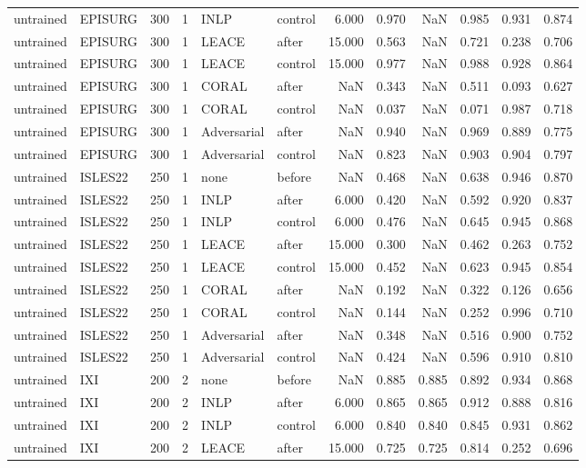 \begin{tabular}{llrrllrrrrrr}
untrained & EPISURG & 300 & 1 & INLP & control & 6.000 & 0.970 & NaN & 0.985 & 0.931 & 0.874 \\
untrained & EPISURG & 300 & 1 & LEACE & after & 15.000 & 0.563 & NaN & 0.721 & 0.238 & 0.706 \\
untrained & EPISURG & 300 & 1 & LEACE & control & 15.000 & 0.977 & NaN & 0.988 & 0.928 & 0.864 \\
untrained & EPISURG & 300 & 1 & CORAL & after & NaN & 0.343 & NaN & 0.511 & 0.093 & 0.627 \\
untrained & EPISURG & 300 & 1 & CORAL & control & NaN & 0.037 & NaN & 0.071 & 0.987 & 0.718 \\
untrained & EPISURG & 300 & 1 & Adversarial & after & NaN & 0.940 & NaN & 0.969 & 0.889 & 0.775 \\
untrained & EPISURG & 300 & 1 & Adversarial & control & NaN & 0.823 & NaN & 0.903 & 0.904 & 0.797 \\
untrained & ISLES22 & 250 & 1 & none & before & NaN & 0.468 & NaN & 0.638 & 0.946 & 0.870 \\
untrained & ISLES22 & 250 & 1 & INLP & after & 6.000 & 0.420 & NaN & 0.592 & 0.920 & 0.837 \\
untrained & ISLES22 & 250 & 1 & INLP & control & 6.000 & 0.476 & NaN & 0.645 & 0.945 & 0.868 \\
untrained & ISLES22 & 250 & 1 & LEACE & after & 15.000 & 0.300 & NaN & 0.462 & 0.263 & 0.752 \\
untrained & ISLES22 & 250 & 1 & LEACE & control & 15.000 & 0.452 & NaN & 0.623 & 0.945 & 0.854 \\
untrained & ISLES22 & 250 & 1 & CORAL & after & NaN & 0.192 & NaN & 0.322 & 0.126 & 0.656 \\
untrained & ISLES22 & 250 & 1 & CORAL & control & NaN & 0.144 & NaN & 0.252 & 0.996 & 0.710 \\
untrained & ISLES22 & 250 & 1 & Adversarial & after & NaN & 0.348 & NaN & 0.516 & 0.900 & 0.752 \\
untrained & ISLES22 & 250 & 1 & Adversarial & control & NaN & 0.424 & NaN & 0.596 & 0.910 & 0.810 \\
untrained & IXI & 200 & 2 & none & before & NaN & 0.885 & 0.885 & 0.892 & 0.934 & 0.868 \\
untrained & IXI & 200 & 2 & INLP & after & 6.000 & 0.865 & 0.865 & 0.912 & 0.888 & 0.816 \\
untrained & IXI & 200 & 2 & INLP & control & 6.000 & 0.840 & 0.840 & 0.845 & 0.931 & 0.862 \\
untrained & IXI & 200 & 2 & LEACE & after & 15.000 & 0.725 & 0.725 & 0.814 & 0.252 & 0.696 \\

\end{tabular}
